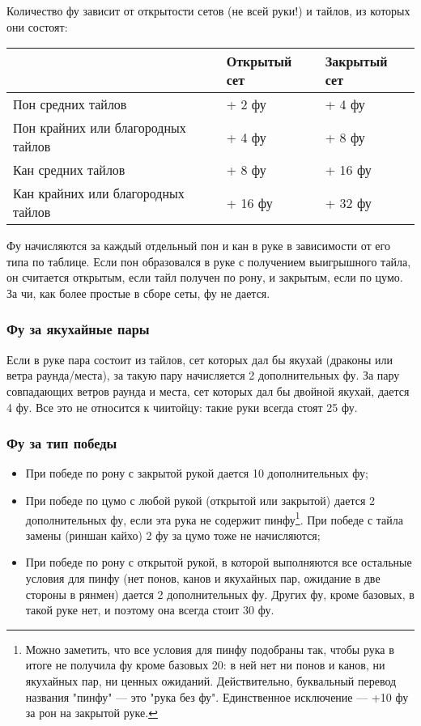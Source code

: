 Количество фу зависит от открытости сетов (не всей руки!) и тайлов, из которых они состоят:

\noindent\begin{tabular}{L{7cm}C{3cm}C{3cm}}
	\toprule
	& Открытый сет &
	Закрытый сет \\
	\midrule
	Пон средних тайлов &
	+ 2 фу &
	+ 4 фу \\
	\midrule
	Пон крайних или благородных тайлов &
	+ 4 фу &
	+ 8 фу \\
	\midrule
	Кан средних тайлов &
	+ 8 фу &
	+ 16 фу \\
	\midrule
	Кан крайних или благородных тайлов &
	+ 16 фу &
	+ 32 фу \\
	\bottomrule
\end{tabular}

Фу начисляются за каждый отдельный пон и кан в руке в зависимости от его типа по таблице. Если пон образовался в руке с получением выигрышного тайла, он считается открытым, если тайл получен по рону, и закрытым, если по цумо. За чи, как более простые в сборе сеты, фу не дается.

\subsubsection{Фу за якухайные пары}

Если в руке пара состоит из тайлов, сет которых дал бы якухай (драконы или ветра раунда/места), за такую пару начисляется 2 дополнительных фу. За пару совпадающих ветров раунда и места, сет которых дал бы двойной якухай, дается 4 фу. Все это не относится к чиитойцу: такие руки всегда стоят 25 фу.

\subsubsection{Фу за тип победы}

\begin{itemize}
	\item При победе по рону с закрытой рукой дается 10 дополнительных фу;
	\item При победе по цумо с любой рукой (открытой или закрытой) дается 2 дополнительных фу, если эта рука не содержит пинфу\footnote{Можно заметить, что все условия для пинфу подобраны так, чтобы рука в итоге не получила фу кроме базовых 20: в ней нет ни понов и канов, ни якухайных пар, ни ценных ожиданий. Действительно, буквальный перевод названия "пинфу" --- это "рука без фу". Единственное исключение --- +10 фу за рон на закрытой руке.}. При победе с тайла замены (риншан кайхо) 2 фу за цумо тоже не начисляются;
	\item При победе по рону с открытой рукой, в которой выполняются все остальные условия для пинфу (нет понов, канов и якухайных пар, ожидание в две стороны в рянмен) дается 2 дополнительных фу. Других фу, кроме базовых, в такой руке нет, и поэтому она всегда стоит 30 фу.
\end{itemize}

